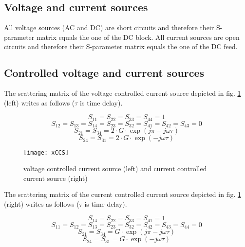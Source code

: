 \subsection{Voltage and current sources}

All voltage sources (AC and DC) are short circuits and therefore their
S-parameter matrix equals the one of the DC block.  All current
sources are open circuits and therefore their S-parameter matrix
equals the one of the DC feed.

\subsection{Controlled voltage and current sources}

The scattering matrix of the voltage controlled current source
depicted in fig. \ref{fig:xCCS} (left) writes as follows ($\tau$ is
time delay).

\begin{equation}
S_{11} = S_{22} = S_{33} = S_{44} = 1
\end{equation}
\begin{equation}
S_{12} = S_{13} = S_{14} = S_{23} = S_{32} = S_{41} = S_{42} = S_{43} = 0
\end{equation}
\begin{equation}
S_{21} = S_{34} = 2\cdot G\cdot \exp\left(j\pi-j\omega\tau\right)
\end{equation}
\begin{equation}
S_{24} = S_{31} = 2\cdot G\cdot \exp\left(-j\omega\tau\right)
\end{equation}

\begin{figure}[ht]
\begin{center}
\texttt{[image: xCCS]}
\end{center}
\caption{voltage controlled current source (left) and current controlled current source (right)}
\label{fig:xCCS}
\end{figure}
\FloatBarrier

The scattering matrix of the current controlled current source
depicted in fig. \ref{fig:xCCS} (right) writes as follows ($\tau$ is
time delay).

\begin{equation}
S_{14} = S_{22} = S_{33} = S_{41} = 1
\end{equation}
\begin{equation}
S_{11} = S_{12} = S_{13} = S_{23} = S_{32} = S_{42} = S_{43} = S_{44} = 0
\end{equation}
\begin{equation}
S_{21} = S_{34} = G\cdot \exp\left(j\pi-j\omega\tau\right)
\end{equation}
\begin{equation}
S_{24} = S_{31} = G\cdot \exp\left(-j\omega\tau\right)
\end{equation}

